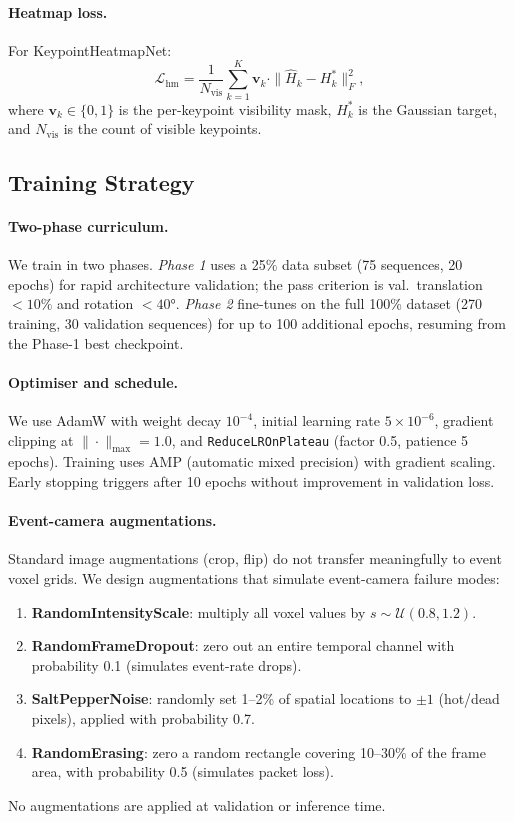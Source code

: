 \documentclass[10pt,twocolumn,letterpaper]{article}
\begin{document}
\paragraph{Heatmap loss.}
For KeypointHeatmapNet:
\begin{equation}
  \mathcal{L}_{\text{hm}} = \frac{1}{N_{\text{vis}}}
  \sum_{k=1}^{K} \mathbf{v}_k \cdot
  \|\hat{H}_k - H_k^*\|_F^2,
\end{equation}
where $\mathbf{v}_k\in\{0,1\}$ is the per-keypoint visibility mask,
$H_k^*$ is the Gaussian target, and $N_{\text{vis}}$ is the count of
visible keypoints.

\subsection{Training Strategy}
\label{sec:training}

\paragraph{Two-phase curriculum.}
We train in two phases.
\emph{Phase 1} uses a 25\% data subset (75 sequences, 20 epochs) for
rapid architecture validation; the pass criterion is val.\ translation
$<10\%$ and rotation $<40°$.
\emph{Phase 2} fine-tunes on the full 100\% dataset (270 training,
30 validation sequences) for up to 100 additional epochs, resuming
from the Phase-1 best checkpoint.

\paragraph{Optimiser and schedule.}
We use AdamW with weight decay $10^{-4}$, initial learning rate
$5\times10^{-6}$, gradient clipping at $\|\cdot\|_{\max}=1.0$,
and \texttt{ReduceLROnPlateau} (factor 0.5, patience 5 epochs).
Training uses AMP (automatic mixed precision) with gradient scaling.
Early stopping triggers after 10 epochs without improvement in
validation loss.

\paragraph{Event-camera augmentations.}
Standard image augmentations (crop, flip) do not transfer meaningfully
to event voxel grids.  We design augmentations that simulate
event-camera failure modes:
\begin{enumerate}
  \item \textbf{RandomIntensityScale}: multiply all voxel values
        by $s \sim \mathcal{U}(0.8, 1.2)$.
  \item \textbf{RandomFrameDropout}: zero out an entire temporal
        channel with probability 0.1 (simulates event-rate drops).
  \item \textbf{SaltPepperNoise}: randomly set 1–2\% of spatial
        locations to $\pm 1$ (hot/dead pixels), applied with
        probability 0.7.
  \item \textbf{RandomErasing}: zero a random rectangle covering
        10–30\% of the frame area, with probability 0.5
        (simulates packet loss).
\end{enumerate}
No augmentations are applied at validation or inference time.
\end{document}

